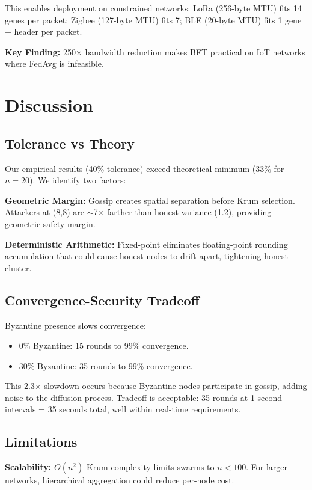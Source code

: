 \documentclass[conference,10pt]{IEEEtran}
\begin{document}
This enables deployment on constrained networks: LoRa (256-byte MTU) fits 14 genes per packet; Zigbee (127-byte MTU) fits 7; BLE (20-byte MTU) fits 1 gene + header per packet.

\textbf{Key Finding:} 250$\times$ bandwidth reduction makes BFT practical on IoT networks where FedAvg is infeasible.

\section{Discussion}
\label{sec:discussion}

\subsection{Tolerance vs Theory}
Our empirical results (40\% tolerance) exceed theoretical minimum (33\% for $n=20$). We identify two factors:

\textbf{Geometric Margin:} Gossip creates spatial separation before Krum selection. Attackers at (8,8) are $\sim$7$\times$ farther than honest variance (1.2), providing geometric safety margin.

\textbf{Deterministic Arithmetic:} Fixed-point eliminates floating-point rounding accumulation that could cause honest nodes to drift apart, tightening honest cluster.

\subsection{Convergence-Security Tradeoff}
Byzantine presence slows convergence:
\begin{itemize}
    \item 0\% Byzantine: 15 rounds to 99\% convergence.
    \item 30\% Byzantine: 35 rounds to 99\% convergence.
\end{itemize}

This 2.3$\times$ slowdown occurs because Byzantine nodes participate in gossip, adding noise to the diffusion process. Tradeoff is acceptable: 35 rounds at 1-second intervals = 35 seconds total, well within real-time requirements.

\subsection{Limitations}
\textbf{Scalability:} $O(n^2)$ Krum complexity limits swarms to $n<100$. For larger networks, hierarchical aggregation could reduce per-node cost.
\end{document}
